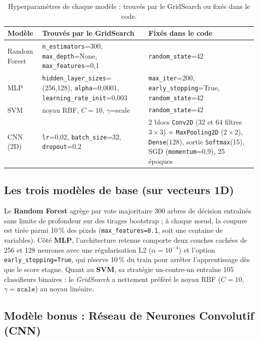 \documentclass[10pt,a4paper]{article}
\begin{document}
\begin{table}[H]
\centering
\caption{Hyperparamètres de chaque modèle : trouvés par le GridSearch ou fixés dans le code.}
\label{tab:params}
\small
\begin{tabular}{p{2.3cm}p{5.0cm}p{5.4cm}}
\toprule
\textbf{Modèle} & \textbf{Trouvés par le GridSearch} & \textbf{Fixés dans le code} \\
\midrule
Random Forest & \texttt{n\_estimators}=300, \texttt{max\_depth}=None, \texttt{max\_features}=0,1 & \texttt{random\_state}=42 \\
\addlinespace
MLP & \texttt{hidden\_layer\_sizes}=(256,128), \texttt{alpha}=0,0001, \texttt{learning\_rate\_init}=0,003 & \texttt{max\_iter}=200, \texttt{early\_stopping}=True, \texttt{random\_state}=42 \\
\addlinespace
SVM & noyau RBF, $C=10$, $\gamma$=scale & \texttt{random\_state}=42 \\
\addlinespace
CNN (2D) & \texttt{lr}=0,02, \texttt{batch\_size}=32, \texttt{dropout}=0,2 & 2 blocs \texttt{Conv2D} (32 et 64 filtres $3\times3$) + \texttt{MaxPooling2D} ($2\times2$), \texttt{Dense}(128), sortie \texttt{Softmax}(15), SGD (\texttt{momentum}=0,9), 25 époques \\
\bottomrule
\end{tabular}
\end{table}

\subsection{Les trois modèles de base (sur vecteurs 1D)}
Le \textbf{Random Forest} agrège par vote majoritaire 300 arbres de décision entraînés sans limite de profondeur sur des tirages bootstrap ; à chaque nœud, la coupure est tirée parmi 10\,\% des pixels (\texttt{max\_features=0.1}, soit une centaine de variables). Côté \textbf{MLP}, l'architecture retenue comporte deux couches cachées de 256 et 128 neurones avec une régularisation L2 ($\alpha=10^{-4}$) et l'option \texttt{early\_stopping=True}, qui réserve 10\,\% du train pour arrêter l'apprentissage dès que le score stagne. Quant au \textbf{SVM}, sa stratégie un-contre-un entraîne 105 classifieurs binaires : le \emph{GridSearch} a nettement préféré le noyau RBF ($C=10$, $\gamma=\texttt{scale}$) au noyau linéaire.

\subsection{Modèle bonus : Réseau de Neurones Convolutif (CNN)}\label{sec:bonus}
\end{document}
